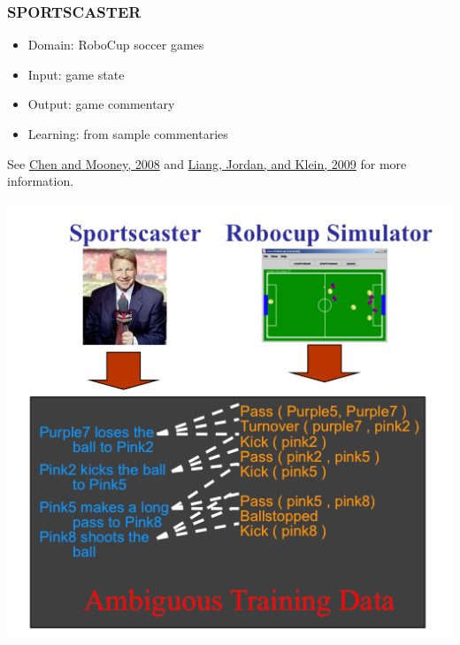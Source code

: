 \documentclass[ignorenonframetext]{beamer}
\begin{document}
\begin{frame}\frametitle{SPORTSCASTER}

\begin{itemize}
\item Domain: RoboCup soccer games
\item Input: game state
\item Output: game commentary
\item Learning: from sample commentaries
\end{itemize}

See \href{http://www.cs.utexas.edu/~ai-lab/pub-view.php?PubID=126770}{Chen and Mooney, 2008} 
and \href{http://cs.stanford.edu/~pliang/papers}{Liang, Jordan, and Klein, 2009}
for more information.

\begin{center}
\href{http://www.cs.utexas.edu/~ai-lab/pub-view.php?PubID=126770}{
\includegraphics[height=.7\textheight]{images/chen-sportscast.png}}
\end{center}
\end{frame}
\end{document}
